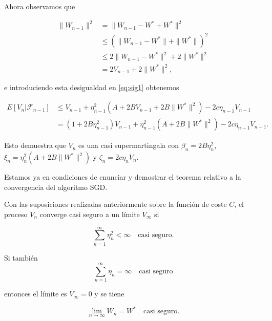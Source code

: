 Ahora observamos que 

\begin{align*}
	\| W_{n-1} \|^2 &= \| W_{n-1} - W^* + W^* \|^2 \\
			     &\leq (\| W_{n-1} - W^* \| + \|W^* \|)^2 \\
			     & \leq 2 \| W_{n-1} - W^* \|^2 + 2 \|W^* \|^2 \\
			     &= 2V_{n-1} + 2 \|W^* \|^2,
\end{align*}

e introduciendo esta desigualdad en \eqref{eq:sig1} obtenemos

\begin{align*}
	E[V_n | \mathcal{F}_{n-1} ] &\leq V_{n-1} + \eta^2_{n-1} (A+ 2BV_{n-1} + 2B \|W^* \|^2) - 2c\eta_{n-1} V_{n-1} \\
					&= (1 + 2B \eta_{n-1}^2) V_{n-1} + \eta^2_{n-1} (A + 2B \| W^* \|^2) - 2c \eta_{n-1} V_{n-1}.
\end{align*}

Esto demuestra que $V_n$ es una casi supermartingala con $\beta_n=2B\eta^2_n$, $\xi_n = \eta_n^2(A + 2B \| W^* \|^2)$ y $\zeta_n =2 c \eta_n V_n$.

Estamos ya en condiciones de enunciar y demostrar el teorema relativo a la convergencia del algoritmo SGD.

\begin{teorema}\label{teor:convsgd}
	Con las suposiciones realizadas anteriormente sobre la función de coste $C$, el proceso $V_n$ converge casi seguro a un límite $V_{\infty}$ si 

	\begin{equation}\label{eq:convsgd1}
		\sum_{n=1}^{\infty} \eta^2_{n} < \infty \quad \text{casi seguro.}
	\end{equation}

	Si también
	\begin{equation}\label{eq:convsgd2}
		\sum_{n=1}^{\infty} \eta_{n} = \infty \quad \text{casi seguro}
	\end{equation}

	entonces el límite es $V_{\infty}=0$ y se tiene

	\begin{equation*}
		\displaystyle \lim_{n \to \infty} W_n = W^* \quad \text{casi seguro.}
	\end{equation*}
\end{teorema}


\vspace{1cm}

